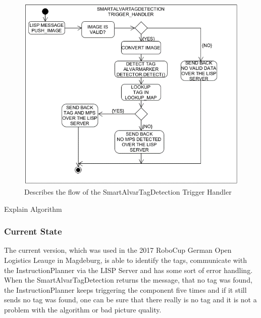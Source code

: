 \begin{figure}[h]
\centering
\includegraphics[scale=0.5]{pic/SmartAlvarTagDetectionFlow.png}
\caption{Describes the flow of the SmartAlvarTagDetection Trigger Handler}
\label{fig:smartAlvarFlow}
\end{figure}


Explain Algorithm


\subsubsection{Current State}

The current version, which was used in the 2017 RoboCup German Open Logistics Leauge in Magdeburg, is able to identify the tags, communicate with the InstructionPlanner via the LISP Server and has some sort of error handling. When the SmartAlvarTagDetection returns the message, that no tag was found, the InstructionPlanner keeps triggering the component five times and if it still sends no tag was found, one can be sure that there really is no tag and it is not a problem with the algorithm or bad picture quality. 
